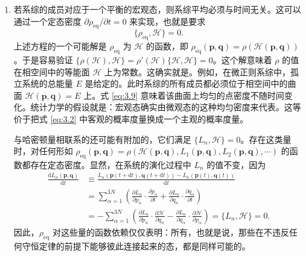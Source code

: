 \begin{enumerate}[itemsep=0.5em,topsep=0.4em,start=3]
  \item 若系综的成员对应于一个平衡的宏观态，则系综平均必须与时间无关。这可以通过一个定态密度 $\partial\rho_{\text{eq}}/\partial t=0$ 来实现，也就是要求
  \begin{equation}\label{eq:3.14}
    \{\rho_{\text{eq}},\mathscr H\}=0.
  \end{equation}
  上述方程的一个可能解是 $\rho_{\text{eq}}$ 为 $\mathscr H$ 的函数，即 $\rho_{\text{eq}}(\bm p,\bm q)=\rho(\mathscr H(\bm p,\bm q))$。于是容易验证 $\{\rho(\mathscr H),\mathscr H\}=\rho'(\mathscr H)\{\mathscr H,\mathscr H\}=0$。这个解意味着 $\rho$ 的值在相空间中的等能面 $\mathscr H$ 上为常数。这确实就是。例如，在微正则系综中，孤立系统的总能量 $E$ 是给定的。此时系综的所有成员都必须位于相空间中的曲面 $\mathscr H(\bm p,\bm q)=E$ 上。式 \eqref{eq:3.9} 意味着该曲面上均匀的点密度不随时间变化。统计力学的假设就是：宏观态确实由微观态的这种均匀密度来代表。这等价于把式 \eqref{eq:3.2} 中客观的概率度量换成一个主观的概率度量。

  与哈密顿量相联系的还可能有附加的，它们满足 $\{L_n,\mathscr H\}=0$。存在这类量时，对任何形如 $\rho_{\text{eq}}(\bm p,\bm q)=\rho(\mathscr H(\bm p,\bm q),L_1(\bm p,\bm q),L_2(\bm p,\bm q),\cdots)$ 的函数都存在定态密度。显然，在系统的演化过程中 $L_n$ 的值不变，因为
  \begin{equation}\label{eq:3.15}
    \begin{aligned}
      \frac{\mathrm{d}L_n(\bm p,\bm q)}{\mathrm{d}t}
      &\equiv\frac{L_n(\bm p(t+\mathrm{d}t),\bm q(t+\mathrm{d}t))-L_n(\bm p(t),\bm q(t))}{\mathrm{d}t}\\
      &=\sum_{\alpha=1}^{3N}\left(\frac{\partial L_n}{\partial p_\alpha}\cdot\frac{\partial p_\alpha}{\partial t}+\frac{\partial L_n}{\partial q_\alpha}\cdot\frac{\partial q_\alpha}{\partial t}\right)\\
      &=-\sum_{\alpha=1}^{3N}\left(\frac{\partial L_n}{\partial p_\alpha}\cdot\frac{\partial\mathscr H}{\partial q_\alpha}-\frac{\partial L_n}{\partial q_\alpha}\cdot\frac{\partial\mathscr H}{\partial p_\alpha}\right)=\{L_n,\mathscr H\}=0.
    \end{aligned}
  \end{equation}
  因此，$\rho_{\text{eq}}$ 对这些量的函数依赖仅仅表明：所有，也就是说，那些在不违反任何守恒定律的前提下能够彼此连接起来的态，都是同样可能的。


\end{enumerate}
